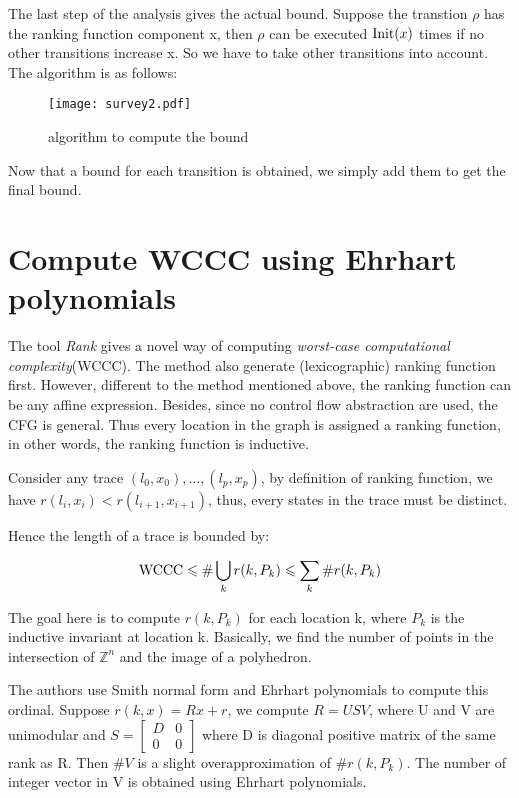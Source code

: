 \begin{survey}
The last step of the analysis gives the actual bound. Suppose the transtion $\rho$ has the ranking function component x, then $\rho$ can be executed $\operatorname{Init} (x)$ times if no other transitions increase x. So we have to take
other transitions into account. The algorithm is as follows:

\begin{figure}
    \centering
    \texttt{[image: survey2.pdf]}
    \caption{algorithm to compute the bound}
\end{figure}

Now that a bound for each transition is obtained, we simply add them to get
the final bound.

\section{Compute WCCC using Ehrhart polynomials}

The tool \textit{Rank}{\cite{alias_multi-dimensional_2010}} gives a novel way of computing \textit{worst-case computational complexity}(WCCC). The method also generate (lexicographic) ranking function first. However, different to the method mentioned above, the ranking function can be any affine expression. Besides, since no control flow abstraction are used, the CFG is general. Thus every location in the graph is assigned a ranking function, in other words, the ranking function is inductive.

Consider any trace $(l_0, x_0), \ldots, (l_p, x_p)$, by definition of ranking function, we have $r (l_i, x_i) < r (l_{i + 1}, x_{i + 1})$, thus, every states in the trace must be distinct.

Hence the length of a trace is bounded by:

\[ \operatorname{WCCC} \leqslant \# \bigcup_k r (k, P_k) \leqslant \sum_k \#r (k, P_k)
\]

The goal here is to compute $r (k, P_k)$ for each location k, where $P_k$ is the inductive invariant at location k. Basically, we find the number of points in the intersection of $\mathbb{Z}^n$ and the image of a polyhedron.

The authors use Smith normal form and Ehrhart polynomials to compute this ordinal. Suppose $r (k, x) = R x + r$, we compute $R = U S V$, where U and V are unimodular and $S = \left[ \begin{array}{cc}
  D & 0\\
  0 & 0
\end{array} \right]$ where D is diagonal positive matrix of the same rank as R. Then $\#V$ is a slight overapproximation of $\#r (k, P_k)$. The number of integer vector in V is obtained using Ehrhart polynomials.




\end{survey}